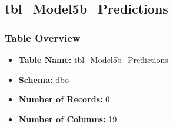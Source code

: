 \begin{landscape}
\subsection{tbl\_Model5b\_Predictions}

\subsubsection{Table Overview}
\begin{itemize}
\item \textbf{Table Name:} tbl\_Model5b\_Predictions
\item \textbf{Schema:} dbo
\item \textbf{Number of Records:} 0
\item \textbf{Number of Columns:} 19
\end{itemize}


\end{landscape}
